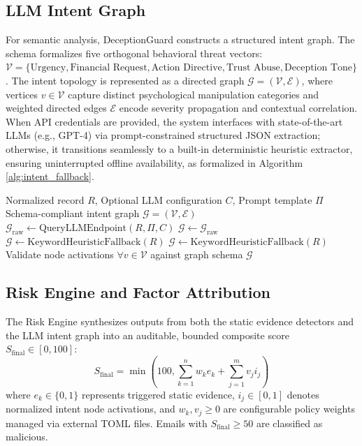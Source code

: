 \documentclass{ieeeaccess}
\begin{document}
\subsection{LLM Intent Graph}
For semantic analysis, DeceptionGuard constructs a structured intent graph. The schema formalizes five orthogonal behavioral threat vectors: $\mathcal{V} = \{\text{Urgency}, \text{Financial Request}, \text{Action Directive}, \text{Trust Abuse}, \text{Deception Tone}\}$. The intent topology is represented as a directed graph $\mathcal{G} = (\mathcal{V}, \mathcal{E})$, where vertices $v \in \mathcal{V}$ capture distinct psychological manipulation categories and weighted directed edges $\mathcal{E}$ encode severity propagation and contextual correlation. When API credentials are provided, the system interfaces with state-of-the-art LLMs (e.g., GPT-4) via prompt-constrained structured JSON extraction; otherwise, it transitions seamlessly to a built-in deterministic heuristic extractor, ensuring uninterrupted offline availability, as formalized in Algorithm \ref{alg:intent_fallback}.

\begin{algorithm}[!t]
\caption{Intent Graph Extraction with Resilient Offline Fallback}
\label{alg:intent_fallback}
\begin{algorithmic}[1]
\REQUIRE Normalized record $R$, Optional LLM configuration $C$, Prompt template $\Pi$
\ENSURE Schema-compliant intent graph $\mathcal{G} = (\mathcal{V}, \mathcal{E})$
    \STATE $\mathcal{G}_{\text{raw}} \leftarrow \text{QueryLLMEndpoint}(R, \Pi, C)$
        \STATE $\mathcal{G} \leftarrow \mathcal{G}_{\text{raw}}$
    \ELSE
        \STATE $\mathcal{G} \leftarrow \text{KeywordHeuristicFallback}(R)$
    \ENDIF
\ELSE
    \STATE $\mathcal{G} \leftarrow \text{KeywordHeuristicFallback}(R)$
\ENDIF
\STATE Validate node activations $\forall v \in \mathcal{V}$ against graph schema
\RETURN $\mathcal{G}$
\end{algorithmic}
\end{algorithm}

\subsection{Risk Engine and Factor Attribution}
The Risk Engine synthesizes outputs from both the static evidence detectors and the LLM intent graph into an auditable, bounded composite score $S_{\text{final}} \in [0, 100]$:
\begin{equation}
S_{\text{final}} = \min\left(100, \sum_{k=1}^{n} w_k e_k + \sum_{j=1}^{m} v_j i_j\right)
\label{eq:risk_score}
\end{equation}
where $e_k \in \{0, 1\}$ represents triggered static evidence, $i_j \in [0, 1]$ denotes normalized intent node activations, and $w_k, v_j \ge 0$ are configurable policy weights managed via external TOML files. Emails with $S_{\text{final}} \ge 50$ are classified as malicious.
\end{document}
